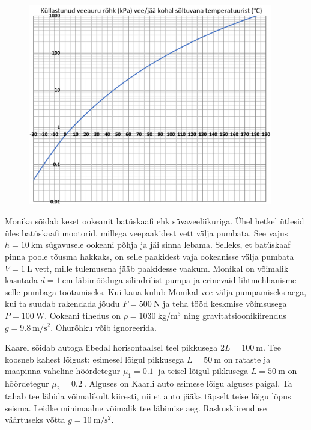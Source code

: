 \documentclass[10pt]{article}
\begin{document}
\begin{figure}[h]
  \vspace{-1em}
  \centering
  \includegraphics[width=0.95\textwidth]{2021-lahg-04-yl.pdf}
  \vspace{-1em}
\end{figure}
\probend
\bigskip


Monika sõidab keset ookeanit batüskaafi ehk süvaveeliikuriga. Ühel hetkel
ütlesid üles batüskaafi mootorid, millega veepaakidest vett välja pumbata. See
vajus $h=\SI{10}{\kilo\meter}$ sügavusele ookeani põhja ja jäi sinna lebama.
Selleks, et batüskaaf pinna poole tõusma hakkaks, on selle paakidest vaja ookeanisse
välja pumbata $V=\SI{1}{\liter}$ vett, mille tulemusena jääb paakidesse vaakum.
Monikal on võimalik kasutada $d=\SI{1}{\centi\meter}$ läbimõõduga silindrilist
pumpa ja erinevaid lihtmehhanisme selle pumbaga töötamiseks. Kui kaua kulub Monikal
vee välja pumpamiseks aega, kui ta suudab rakendada jõudu $F=\SI{500}{\newton}$
ja teha tööd keskmise võimsusega $P=\SI{100}{\watt}$. Ookeani tihedus on
$\rho=\SI{1030}{\kilo\gram\per\meter\cubed}$ ning gravitatsioonikiirendus
$g=\SI{9.8}{\meter\per\second\squared}$. Õhurõhku võib ignoreerida.
\probend
\bigskip


Kaarel sõidab autoga libedal horisontaalsel teel pikkusega $2L=\SI{100}{\m}$. Tee koosneb kahest lõigust: esimesel lõigul pikkusega $L=\SI{50}{\m}$ on rataste ja maapinna vaheline hõõrdetegur $\mu_1=\SI{0.1}{}$ ja teisel lõigul pikkusega $L=\SI{50}{\m}$ on hõõrdetegur $\mu_2=\SI{0.2}{}$. Alguses on Kaarli auto esimese lõigu alguses paigal. Ta tahab tee läbida võimalikult kiiresti, nii et auto jääks täpselt teise lõigu lõpus seisma. Leidke minimaalne võimalik tee läbimise aeg. Raskuskiirenduse väärtuseks võtta $g=\SI{10}{\m\per\s\squared}$.
\probend
\bigskip
\end{document}
